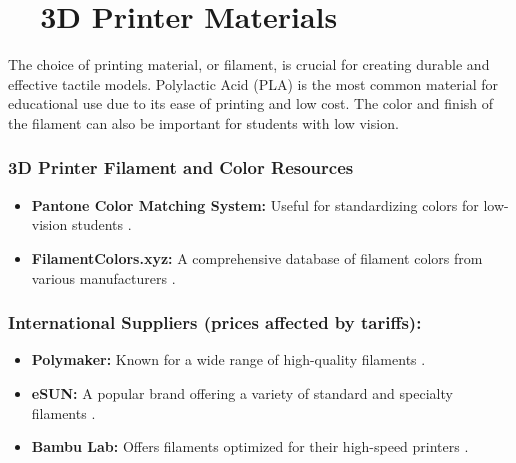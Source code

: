 \section{~~3D Printer Materials}\label{ch5:sec:materials}
The choice of printing material, or filament, is crucial for creating durable and effective tactile models. Polylactic Acid (PLA) is the most common material for educational use due to its ease of printing and low cost. The color and finish of the filament can also be important for students with low vision.\supercite{FilamentColors, Pantone}

\subsubsection{3D Printer Filament and Color Resources}
\begin{itemize}
	\item \textbf{Pantone Color Matching System:} Useful for standardizing colors for low-vision students \supercite{Pantone}.
	\item \textbf{FilamentColors.xyz:} A comprehensive database of filament colors from various manufacturers \supercite{FilamentColors}.
\end{itemize}

\subsubsection{International Suppliers (prices affected by tariffs):}
\begin{itemize}
	\item \textbf{Polymaker:} Known for a wide range of high-quality filaments \supercite{Polymaker}.
	\item \textbf{eSUN:} A popular brand offering a variety of standard and specialty filaments \supercite{eSUN}.
	\item \textbf{Bambu Lab:} Offers filaments optimized for their high-speed printers \supercite{BambuLab}.
\end{itemize}

